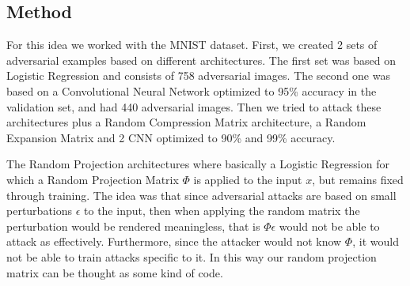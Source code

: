 \documentclass{asaproc}
\begin{document}
\subsection*{Method}

For this idea we worked with the MNIST dataset. First, we created 2 sets of adversarial examples based on different architectures. The first set was based on Logistic Regression and consists of 758 adversarial images. The second one was based on a Convolutional Neural Network optimized to 95\% accuracy in the validation set, and had 440 adversarial images. Then we tried to attack these architectures plus a Random Compression Matrix architecture, a Random Expansion Matrix and 2 CNN optimized to 90\% and 99\% accuracy.

The Random Projection architectures where basically a Logistic Regression for which a Random Projection Matrix $ \Phi $ is applied to the input $ x $, but remains fixed through training. The idea was that since adversarial attacks are based on small perturbations $ \epsilon $ to the input, then when applying the random matrix the perturbation would be rendered meaningless, that is $ \Phi \epsilon $ would not be able to attack as effectively. Furthermore, since the attacker would not know $ \Phi $, it would not be able to train attacks specific to it. In this way our random projection matrix can be thought as some kind of code.
\end{document}

